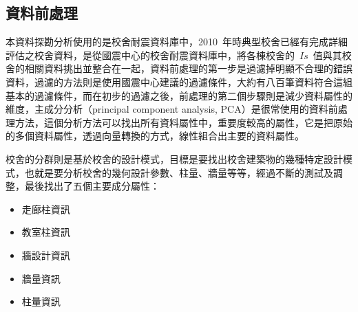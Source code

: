 
\subsection{資料前處理}

本資料探勘分析使用的是校舍耐震資料庫中，2010~年時典型校舍已經有完成詳細評估之校舍資料，是從國震中心的校舍耐震資料庫中，將各棟校舍的~$Is$~值與其校舍的相關資料挑出並整合在一起，資料前處理的第一步是過濾掉明顯不合理的錯誤資料，過濾的方法則是使用國震中心建議的過濾條件，大約有八百筆資料符合這組基本的過濾條件，而在初步的過濾之後，前處理的第二個步驟則是減少資料屬性的維度，主成分分析（principal component analysis, PCA）是很常使用的資料前處理方法，這個分析方法可以找出所有資料屬性中，重要度較高的屬性，它是把原始的多個資料屬性，透過向量轉換的方式，線性組合出主要的資料屬性。


校舍的分群則是基於校舍的設計模式，目標是要找出校舍建築物的幾種特定設計模式，也就是要分析校舍的幾何設計參數、柱量、牆量等等，經過不斷的測試及調整，最後找出了五個主要成分屬性：

\begin{itemize}
\item 走廊柱資訊
\item 教室柱資訊
\item 牆設計資訊
\item 牆量資訊
\item 柱量資訊
\end{itemize}


